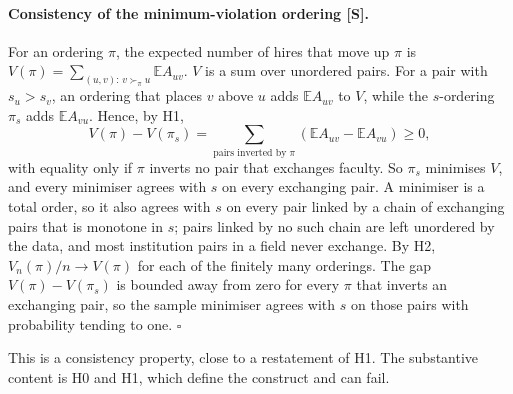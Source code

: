 \documentclass[11pt]{article}
\begin{document}
\paragraph{Consistency of the minimum-violation ordering [S].} For an ordering $\pi$, the expected number of
hires that move up $\pi$ is $V(\pi)=\sum_{(u,v):\,v\succ_\pi u}\mathbb E A_{uv}$. $V$ is a sum over unordered
pairs. For a pair with $s_u>s_v$, an ordering that places $v$ above $u$ adds $\mathbb E A_{uv}$ to $V$, while
the $s$-ordering $\pi_s$ adds $\mathbb E A_{vu}$. Hence, by H1,
\[
V(\pi)-V(\pi_s)=\sum_{\text{pairs inverted by }\pi}(\mathbb E A_{uv}-\mathbb E A_{vu})\ge0 ,
\]
with equality only if $\pi$ inverts no pair that exchanges faculty. So $\pi_s$ minimises $V$, and every minimiser
agrees with $s$ on every exchanging pair. A minimiser is a total order, so it also agrees with $s$ on every pair
linked by a chain of exchanging pairs that is monotone in $s$; pairs linked by no such chain are left unordered
by the data, and most institution pairs in a field never exchange. By H2, $V_n(\pi)/n\to V(\pi)$ for each of the
finitely many orderings. The gap $V(\pi)-V(\pi_s)$ is bounded away from zero for every $\pi$ that inverts an
exchanging pair, so the sample minimiser \citep{clauset2015systematic} agrees with $s$ on those pairs with
probability tending to one. $\square$

This is a consistency property, close to a restatement of H1. The substantive content is H0 and H1, which define
the construct and can fail.
\end{document}
